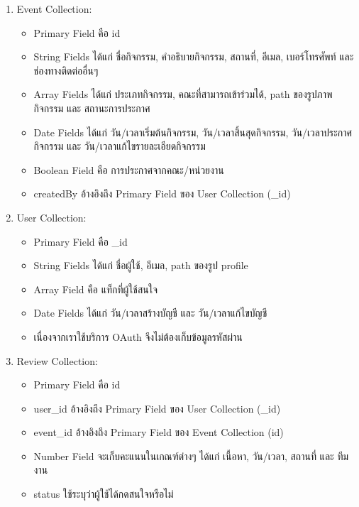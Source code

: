 \begin{enumerate}
\item Event Collection: 
\begin{itemize}
  \item Primary Field คือ id
  \item String Fields ได้แก่ ชื่อกิจกรรม, คำอธิบายกิจกรรม, สถานที่, อีเมล, เบอร์โทรศัพท์ และ ช่องทางติดต่ออื่นๆ
  \item Array Fields ได้แก่ ประเภทกิจกรรม, คณะที่สามารถเข้าร่วมได้, path ของรูปภาพกิจกรรม และ สถานะการประกาศ
  \item Date Fields ได้แก่ วัน/เวลาเริ่มต้นกิจกรรม, วัน/เวลาสิ้นสุดกิจกรรม, วัน/เวลาประกาศกิจกรรม และ วัน/เวลาแก้ไขรายละเอียดกิจกรรม
  \item Boolean Field คือ การประกาศจากคณะ/หน่วยงาน
  \item createdBy อ้างอิงถึง Primary Field ของ User Collection (\_id)
\end{itemize}
\item User Collection:
\begin{itemize}
  \item Primary Field คือ \_id
  \item String Fields ได้แก่ ชื่อผู้ใช้, อีเมล, path ของรูป profile
  \item Array Field คือ แท็กที่ผู้ใช้สนใจ
  \item Date Fields ได้แก่ วัน/เวลาสร้างบัญชี และ วัน/เวลาแก้ไขบัญชี
  \item เนื่องจากเราใช้บริการ OAuth จึงไม่ต้องเก็บข้อมูลรหัสผ่าน
\end{itemize}
\item Review Collection: 
\begin{itemize}
  \item Primary Field คือ id
  \item user\_id อ้างอิงถึง Primary Field ของ User Collection (\_id)
  \item event\_id อ้างอิงถึง Primary Field ของ Event Collection (id)
  \item Number Field จะเก็บคะแนนในเกณฑ์ต่างๆ ได้แก่ เนื้อหา, วัน/เวลา, สถานที่ และ ทีมงาน
  \item status ใช้ระบุว่าผู้ใช้ได้กดสนใจหรือไม่
\end{itemize}
\end{enumerate}

